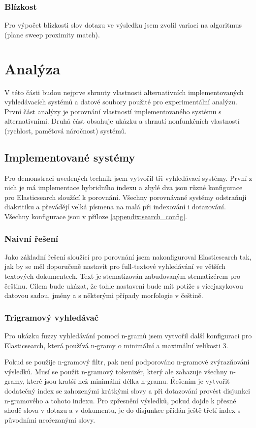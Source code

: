 \documentclass[11pt,letterpaper,oneside,openright]{book}
\begin{document}
\subsection{Blízkost}
Pro výpočet blízkosti slov dotazu ve výsledku jsem zvolil variaci na algoritmus
(plane sweep proximity match).


\chapter{Analýza}
V této části budou nejprve shrnuty vlastnosti alternativních implementovaných
vyhledávacích systémů a datové soubory použité pro experimentální analýzu.
První část analýzy je porovnání vlastností implementovaného systému s
alternativními. Druhá část obsahuje ukázku a shrnutí nonfunkčních vlastností
(rychlost, paměťová náročnost) systémů.

\section{Implementované systémy}
Pro demonstraci uvedených technik jsem vytvořil tři vyhledávací systémy. První
z nich je má implementace hybridního indexu a zbylé dva jsou různé konfigurace
pro Elasticsearch sloužící k porovnání. Všechny porovnávané systémy odstraňují
diakritiku a převádějí velká písmena na malá při indexování i dotazování.
Všechny konfigurace jsou v příloze \ref{appendix:search_config}.

\subsection{Naivní řešení}
Jako základní řešení sloužící pro porovnání jsem nakonfiguroval Elasticsearch
tak, jak by se měl doporučeně nastavit pro full-textové vyhledávání ve větších
textových dokumentech. Text je stematizován zabudovaným stematizérem pro
češtinu. Cílem bude ukázat, že tohle nastavení bude mít potíže s vícejazykovou
datovou sadou, jmény a s některými případy morfologie v češtině.

\subsection{Trigramový vyhledávač}
Pro ukázku fuzzy vyhledávání pomocí n-gramů jsem vytvořil další konfiguraci pro
Elasticsearch, která používá n-gramy o minimální a maximální velikosti 3.

Pokud se použije n-gramový filtr, pak není podporováno n-gramové zvýrazňování
výsledků. Musí se použít n-gramový tokenizér, který ale zahazuje všechny n-gramy,
které jsou kratší než minimální délka n-gramu. Řešením je vytvořit dodatečný
index se zahozenými krátkými slovy a při dotazování provést disjunkci
n-gramového a tohoto indexu. Pro zpřesnění výsledků, pokud dojde k přesné shodě
slova v dotazu a v dokumentu, je do disjunkce přidán ještě třetí index s
původními neořezanými slovy.
\end{document}
